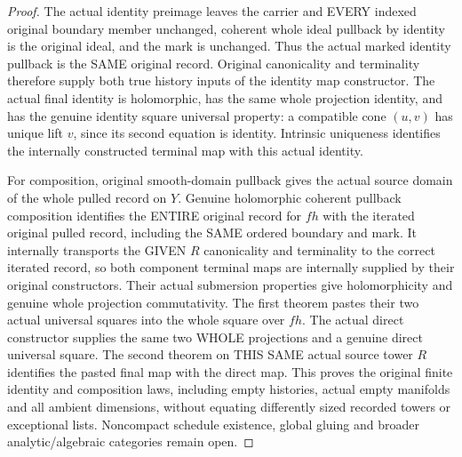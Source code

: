 \begin{proof}
The actual identity preimage leaves the carrier and EVERY indexed original
boundary member unchanged, coherent whole ideal pullback by identity is
the original ideal, and the mark is unchanged. Thus the actual marked
identity pullback is the SAME original record. Original canonicality and
terminality therefore supply both true history inputs of the identity
map constructor. The actual final identity is holomorphic, has the same
whole projection identity, and has the genuine identity square universal
property: a compatible cone $(u,v)$ has unique lift $v$, since its second
equation is identity. Intrinsic uniqueness identifies the internally
constructed terminal map with this actual identity.

For composition, original smooth-domain pullback gives the actual source
domain of the whole pulled record on $Y$. Genuine holomorphic coherent
pullback composition identifies the ENTIRE original record for $fh$ with
the iterated original pulled record, including the SAME ordered boundary
and mark. It internally transports the GIVEN $R$ canonicality and
terminality to the correct iterated record, so both component terminal
maps are internally supplied by their original constructors. Their actual
submersion properties give holomorphicity and genuine whole projection
commutativity. The first theorem pastes their two actual universal squares
into the whole square over $fh$. The actual direct constructor supplies
the same two WHOLE projections and a genuine direct universal square.
The second theorem on THIS SAME actual source tower $R$ identifies the
pasted final map with the direct map. This proves the original finite
identity and composition laws, including empty histories, actual empty
manifolds and all ambient dimensions, without equating differently sized
recorded towers or exceptional lists. Noncompact schedule existence,
global gluing and broader analytic/algebraic categories remain open.
\end{proof}
